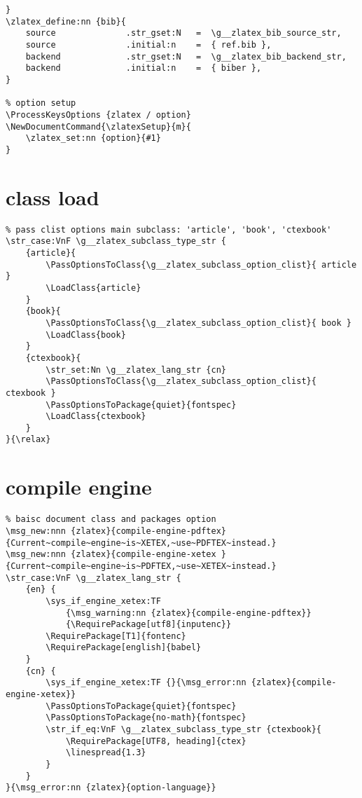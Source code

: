\begin{verbatim}
}
\zlatex_define:nn {bib}{
    source              .str_gset:N   =  \g__zlatex_bib_source_str,
    source              .initial:n    =  { ref.bib },
    backend             .str_gset:N   =  \g__zlatex_bib_backend_str,
    backend             .initial:n    =  { biber },
}

% option setup
\ProcessKeysOptions {zlatex / option}
\NewDocumentCommand{\zlatexSetup}{m}{
    \zlatex_set:nn {option}{#1}
}
\end{verbatim}

\section{class load}
\begin{verbatim}
% pass clist options main subclass: 'article', 'book', 'ctexbook'
\str_case:VnF \g__zlatex_subclass_type_str {
    {article}{
        \PassOptionsToClass{\g__zlatex_subclass_option_clist}{ article }
        \LoadClass{article}
    }
    {book}{
        \PassOptionsToClass{\g__zlatex_subclass_option_clist}{ book }
        \LoadClass{book}   
    }
    {ctexbook}{
        \str_set:Nn \g__zlatex_lang_str {cn}
        \PassOptionsToClass{\g__zlatex_subclass_option_clist}{ ctexbook }
        \PassOptionsToPackage{quiet}{fontspec}
        \LoadClass{ctexbook}    
    }
}{\relax}
\end{verbatim}

\section{compile engine}
\begin{verbatim}
% baisc document class and packages option
\msg_new:nnn {zlatex}{compile-engine-pdftex}{Current~compile~engine~is~XETEX,~use~PDFTEX~instead.}
\msg_new:nnn {zlatex}{compile-engine-xetex }{Current~compile~engine~is~PDFTEX,~use~XETEX~instead.}
\str_case:VnF \g__zlatex_lang_str {
    {en} { 
        \sys_if_engine_xetex:TF 
            {\msg_warning:nn {zlatex}{compile-engine-pdftex}}
            {\RequirePackage[utf8]{inputenc}}
        \RequirePackage[T1]{fontenc}
        \RequirePackage[english]{babel}
    }
    {cn} {
        \sys_if_engine_xetex:TF {}{\msg_error:nn {zlatex}{compile-engine-xetex}}
        \PassOptionsToPackage{quiet}{fontspec}
        \PassOptionsToPackage{no-math}{fontspec}
        \str_if_eq:VnF \g__zlatex_subclass_type_str {ctexbook}{
            \RequirePackage[UTF8, heading]{ctex}
            \linespread{1.3}
        }
    }
}{\msg_error:nn {zlatex}{option-language}}   
\end{verbatim}

